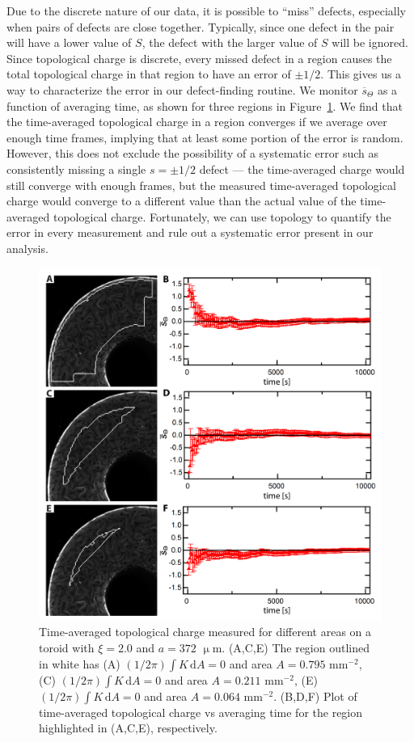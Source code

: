 Due to the discrete nature of our data, it is possible to ``miss'' defects, especially when pairs of defects are close together.
Typically, since one defect in the pair will have a lower value of $S$, the defect with the larger value of $S$ will be ignored.
Since topological charge is discrete, every missed defect in a region causes the total topological charge in that region to have an error of $\pm 1/2$.
This gives us a way to characterize the error in our defect-finding routine.
We monitor $\overbar{s}_{\Theta}$ as a function of averaging time, as shown for three regions in Figure~\ref{f:3-ChargeOverTime}.
We find that the time-averaged topological charge in a region converges if we average over enough time frames, implying that at least some portion of the error is random.
However, this does not exclude the possibility of a systematic error such as consistently missing a single $s = \pm 1/2$ defect --- the time-averaged charge would still converge with enough frames, but the measured time-averaged topological charge would converge to a different value than the actual value of the time-averaged topological charge.
Fortunately, we can use topology to quantify the error in every measurement and rule out a systematic error present in our analysis.
\begin{figure}
  \centering
  \includegraphics{figures/C3/Ch3-Figs_ChargeOverTime.png}
  \caption{Time-averaged topological charge measured for different areas on a toroid with $\xi = 2.0$ and $a = 372$ $\upmu$m.
  (A,C,E) The region outlined in white has (A) $(1/2 \pi) \int K \, \textrm{d}A = 0$ and area $A = 0.795$ mm$^{-2}$, (C) $(1/2 \pi) \int K \, \textrm{d}A = 0$ and area $A = 0.211$ mm$^{-2}$, (E) $(1/2 \pi) \int K \, \textrm{d}A = 0$ and area $A = 0.064$ mm$^{-2}$.
  (B,D,F) Plot of time-averaged topological charge vs averaging time for the region highlighted in (A,C,E), respectively.}\label{f:3-ChargeOverTime}
\end{figure}

